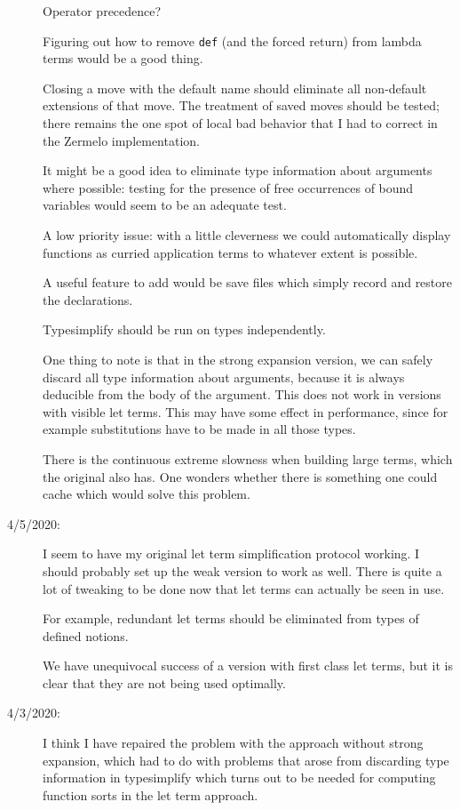 \documentclass[12pt]{article}
\begin{document}
\begin{description}
Operator precedence?

Figuring out how to remove {\tt def} (and the forced return) from lambda terms would be a good thing.

Closing a move with the default name should eliminate all non-default extensions of that move.  The treatment of saved moves should be tested;  there remains the one
spot of local bad behavior that I had to correct in the Zermelo implementation.

It might be a good idea to eliminate type information about arguments where possible:  testing for the presence of free occurrences of bound variables would seem to 
be an adequate test.

A low priority issue:  with a little cleverness we could automatically display functions as curried application terms to whatever extent is possible.

A useful feature to add would be save files which simply record and restore the declarations.

Typesimplify should be run on types independently.

One thing to note is that in the strong expansion version, we can safely discard all type information about arguments, because it is always deducible from the body of the argument.
This does not work in versions with visible let terms.  This may have some effect in performance, since for example substitutions have to be made in all those types.

There is the continuous extreme slowness when building large terms, which the original also has.  One wonders whether there is something one could cache which would solve this problem.

\item[4/5/2020:]  I seem to have my original let term simplification protocol working.  I should probably
set up the weak version to work as well.  There is quite a lot of tweaking to be done now that let terms
can actually be seen in use.

For example, redundant let terms should be eliminated from types of defined notions.

We have unequivocal success of a version with first class let terms, but it is clear that they are not being used optimally.

\item[4/3/2020:]  I think I have repaired the problem with the approach without strong expansion,
which had to do with problems that arose from discarding type information in typesimplify which turns
out to be needed for computing function sorts in the let term approach.


\end{description}
\end{document}
